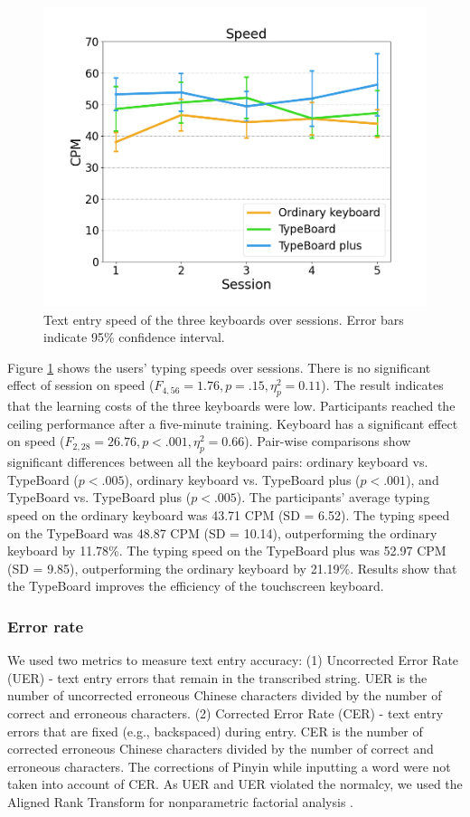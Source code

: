 \begin{figure}[!tbh]
	\includegraphics[width=0.6\linewidth]{figures/speed.png}
	\centering
	\caption{Text entry speed of the three keyboards over sessions. Error bars indicate 95\% confidence interval.}
	\label{fig:speed}
\end{figure}

Figure \ref{fig:speed} shows the users' typing speeds over sessions. There is no significant effect of session on speed ($F_{4,56}=1.76,p=.15,\eta_p^2=0.11$). The result indicates that the learning costs of the three keyboards were low. Participants reached the ceiling performance after a five-minute training. Keyboard has a significant effect on speed ($F_{2,28}=26.76,p<.001,\eta_p^2=0.66$). Pair-wise comparisons show significant differences between all the keyboard pairs: ordinary keyboard vs. TypeBoard ($p<.005$), ordinary keyboard vs. TypeBoard plus ($p<.001$), and TypeBoard vs. TypeBoard plus ($p<.005$). The participants' average typing speed on the ordinary keyboard was 43.71 CPM (SD = 6.52). The typing speed on the TypeBoard was 48.87 CPM (SD = 10.14), outperforming the ordinary keyboard by 11.78\%. The typing speed on the TypeBoard plus was 52.97 CPM (SD = 9.85), outperforming the ordinary keyboard by 21.19\%. Results show that the TypeBoard improves the efficiency of the touchscreen keyboard.

\subsubsection{Error rate}

We used two metrics to measure text entry accuracy: (1) Uncorrected Error Rate (UER) - text entry errors that remain in the transcribed string. UER is the number of uncorrected erroneous Chinese characters divided by the number of correct and erroneous characters. (2) Corrected Error Rate (CER) - text entry errors that are fixed (e.g., backspaced) during entry. CER is the number of corrected erroneous Chinese characters divided by the number of correct and erroneous characters. The corrections of Pinyin while inputting a word were not taken into account of CER. As UER and UER violated the normalcy, we used the Aligned Rank Transform for nonparametric factorial analysis \cite{2011-Aligned}.

